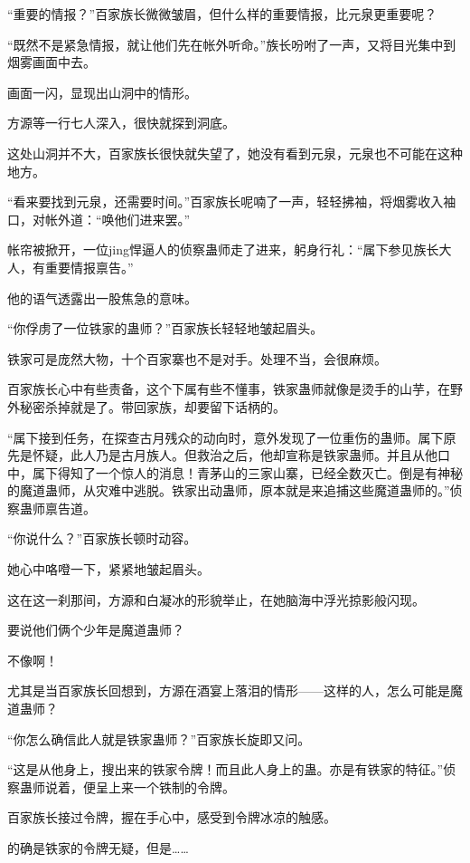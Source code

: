 
\begin{this_body}

“重要的情报？”百家族长微微皱眉，但什么样的重要情报，比元泉更重要呢？

“既然不是紧急情报，就让他们先在帐外听命。”族长吩咐了一声，又将目光集中到烟雾画面中去。

画面一闪，显现出山洞中的情形。

方源等一行七人深入，很快就探到洞底。

这处山洞并不大，百家族长很快就失望了，她没有看到元泉，元泉也不可能在这种地方。

“看来要找到元泉，还需要时间。”百家族长呢喃了一声，轻轻拂袖，将烟雾收入袖口，对帐外道：“唤他们进来罢。”

帐帘被掀开，一位jing悍逼人的侦察蛊师走了进来，躬身行礼：“属下参见族长大人，有重要情报禀告。”

他的语气透露出一股焦急的意味。

“你俘虏了一位铁家的蛊师？”百家族长轻轻地皱起眉头。

铁家可是庞然大物，十个百家寨也不是对手。处理不当，会很麻烦。

百家族长心中有些责备，这个下属有些不懂事，铁家蛊师就像是烫手的山芋，在野外秘密杀掉就是了。带回家族，却要留下话柄的。

“属下接到任务，在探查古月残众的动向时，意外发现了一位重伤的蛊师。属下原先是怀疑，此人乃是古月族人。但救治之后，他却宣称是铁家蛊师。并且从他口中，属下得知了一个惊人的消息！青茅山的三家山寨，已经全数灭亡。倒是有神秘的魔道蛊师，从灾难中逃脱。铁家出动蛊师，原本就是来追捕这些魔道蛊师的。”侦察蛊师禀告道。

“你说什么？”百家族长顿时动容。

她心中咯噔一下，紧紧地皱起眉头。

这在这一刹那间，方源和白凝冰的形貌举止，在她脑海中浮光掠影般闪现。

要说他们俩个少年是魔道蛊师？

不像啊！

尤其是当百家族长回想到，方源在酒宴上落泪的情形——这样的人，怎么可能是魔道蛊师？

“你怎么确信此人就是铁家蛊师？”百家族长旋即又问。

“这是从他身上，搜出来的铁家令牌！而且此人身上的蛊。亦是有铁家的特征。”侦察蛊师说着，便呈上来一个铁制的令牌。

百家族长接过令牌，握在手心中，感受到令牌冰凉的触感。

的确是铁家的令牌无疑，但是……


\end{this_body}
